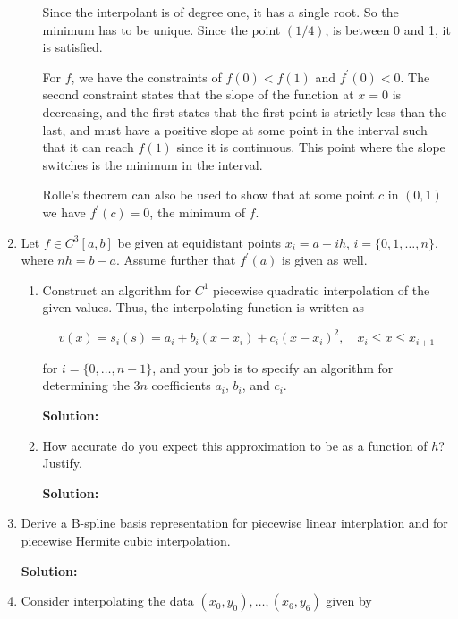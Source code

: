 \documentclass[12pt]{article}
\begin{document}
\begin{enumerate}
\begin{enumerate}
  Since the interpolant is of degree one, it has a single root. So the minimum
  has to be unique. Since the point $(1/4)$, is between 0 and 1, it is satisfied.

  For $f$, we have the constraints of $f(0) < f(1)$ and $f^{\prime}(0) < 0$. The
  second constraint states that the slope of the function at $x=0$ is decreasing,
  and the first states that the first point is strictly less than the last, and
  must have a positive slope at some point in the interval such that it can reach
  $f(1)$ since it is continuous. This point where the slope switches is the minimum
  in the interval.

  Rolle's theorem can also be used to show that at some point $c$ in $(0, 1)$ we
  have $f^{\prime}(c) = 0$, the minimum of $f$.

\end{enumerate}

\item Let $f \in C^{3}[a,b]$ be given at equidistant points $x_{i} = a + ih$, $i = \{0,1,\ldots,n\}$,
where $nh = b-a$. Assume further that $f^{\prime}(a)$ is given as well.

\begin{enumerate}
  \item Construct an algorithm for $C^{1}$ piecewise quadratic interpolation of the
  given values. Thus, the interpolating function is written as

  \[
    v(x) = s_{i}(s) = a_{i} + b_{i}\left( x - x_{i}\right) + c_{i}\left( x-x_{i}\right)^{2},\quad x_{i} \leq x \leq x_{i+1}
  \]

  for $i = \{0,\ldots,n-1\}$, and your job is to specify an algorithm for determining
  the $3n$ coefficients $a_{i}$, $b_{i}$, and $c_{i}$.

  {\bf Solution:}

  \item How accurate do you expect this approximation to be as a function of $h$? Justify.

  {\bf Solution:}

\end{enumerate}

\item Derive a B-spline basis representation for piecewise linear interplation and
for piecewise Hermite cubic interpolation.

{\bf Solution:}


\item Consider interpolating the data $\left(x_{0}, y_{0}\right),\ldots,\left(x_{6}, y_{6}\right)$
given by


\end{enumerate}
\end{document}
